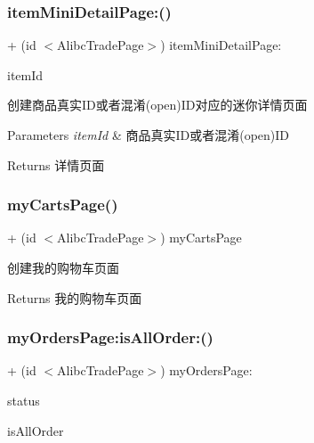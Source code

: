 \subsubsection{\texorpdfstring{item\+Mini\+Detail\+Page\+:()}{itemMiniDetailPage:()}}
{\footnotesize\ttfamily + (id $<$Alibc\+Trade\+Page$>$) item\+Mini\+Detail\+Page\+: \begin{DoxyParamCaption}\item[{(N\+S\+String $\ast$)}]{item\+Id }\end{DoxyParamCaption}}

创建商品真实\+I\+D或者混淆(open)I\+D对应的迷你详情页面


\begin{DoxyParams}{Parameters}
{\em item\+Id} & 商品真实\+I\+D或者混淆(open)ID\\
\hline
\end{DoxyParams}
\begin{DoxyReturn}{Returns}
详情页面 
\end{DoxyReturn}
\mbox{\label{interface_alibc_trade_page_factory_a05916ca9c20018ab175e806daa6b8927}} 
\subsubsection{\texorpdfstring{my\+Carts\+Page()}{myCartsPage()}}
{\footnotesize\ttfamily + (id $<$Alibc\+Trade\+Page$>$) my\+Carts\+Page \begin{DoxyParamCaption}{ }\end{DoxyParamCaption}}

创建我的购物车页面

\begin{DoxyReturn}{Returns}
我的购物车页面 
\end{DoxyReturn}
\mbox{\label{interface_alibc_trade_page_factory_a77f3b85bc47e39b82b5c20459c0d4492}} 
\subsubsection{\texorpdfstring{my\+Orders\+Page\+:is\+All\+Order\+:()}{myOrdersPage:isAllOrder:()}}
{\footnotesize\ttfamily + (id $<$Alibc\+Trade\+Page$>$) my\+Orders\+Page\+: \begin{DoxyParamCaption}\item[{(N\+S\+Integer)}]{status }\item[{isAllOrder:(B\+O\+OL)}]{is\+All\+Order }\end{DoxyParamCaption}}

